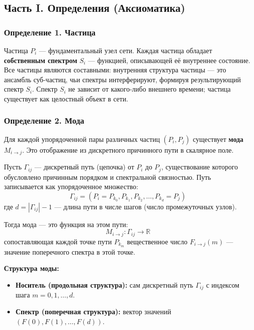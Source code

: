 \documentclass[12pt,a4paper]{article}
\begin{document}
\subsection{Часть I. Определения (Аксиоматика)}

\subsubsection{Определение 1. Частица}
Частица $P_i$ --- фундаментальный узел сети. Каждая частица обладает \textbf{собственным спектром} $S_i$ --- функцией, описывающей её внутреннее состояние. Все частицы являются составными: внутренняя структура частицы --- это ансамбль суб-частиц, чьи спектры интерферируют, формируя результирующий спектр $S_i$. Спектр $S_i$ не зависит от какого-либо внешнего времени; частица существует как целостный объект в сети.

\subsubsection{Определение 2. Мода}
Для каждой упорядоченной пары различных частиц $(P_i, P_j)$ существует \textbf{мода} $M_{i \to j}$. Это отображение из дискретного причинного пути в скалярное поле.

Пусть $\Gamma_{ij}$ --- дискретный путь (цепочка) от $P_i$ до $P_j$, существование которого обусловлено причинным порядком и спектральной связностью. Путь записывается как упорядоченное множество:
\begin{equation}
    \Gamma_{ij} = (P_i = P_{k_0}, P_{k_1}, P_{k_2}, \dots, P_{k_d} = P_j)
\end{equation}
где $d = |\Gamma_{ij}| - 1$ --- длина пути в числе шагов (число промежуточных узлов).

Тогда мода --- это функция на этом пути:
\begin{equation}
    M_{i \to j}: \Gamma_{ij} \to \mathbb{R}
\end{equation}
сопоставляющая каждой точке пути $P_{k_m}$ вещественное число $F_{i \to j}(m)$ --- значение поперечного спектра в этой точке.

\textbf{Структура моды:}
\begin{itemize}
    \item \textbf{Носитель (продольная структура):} сам дискретный путь $\Gamma_{ij}$ с индексом шага $m = 0, 1, \dots, d$.
    \item \textbf{Спектр (поперечная структура):} вектор значений $(F(0), F(1), \dots, F(d))$.
\end{itemize}
\end{document}
